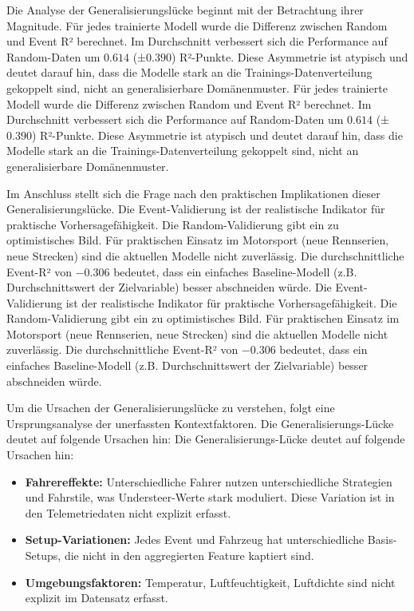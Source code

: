 Die Analyse der Generalisierungslücke beginnt mit der Betrachtung ihrer Magnitude. Für jedes trainierte Modell wurde die Differenz zwischen Random und Event R² berechnet. Im Durchschnitt verbessert sich die Performance auf Random-Daten um $0.614$ (±$0.390$) R²-Punkte. Diese Asymmetrie ist atypisch und deutet darauf hin, dass die Modelle stark an die Trainings-Datenverteilung gekoppelt sind, nicht an generalisierbare Domänenmuster.
Für jedes trainierte Modell wurde die Differenz zwischen Random und Event R² berechnet. Im Durchschnitt verbessert sich die Performance auf Random-Daten um $0.614$ (±$0.390$) R²-Punkte. Diese Asymmetrie ist atypisch und deutet darauf hin, dass die Modelle stark an die Trainings-Datenverteilung gekoppelt sind, nicht an generalisierbare Domänenmuster.

Im Anschluss stellt sich die Frage nach den praktischen Implikationen dieser Generalisierungslücke. Die Event-Validierung ist der realistische Indikator für praktische Vorhersagefähigkeit. Die Random-Validierung gibt ein zu optimistisches Bild. Für praktischen Einsatz im Motorsport (neue Rennserien, neue Strecken) sind die aktuellen Modelle nicht zuverlässig. Die durchschnittliche Event-R² von $-0.306$ bedeutet, dass ein einfaches Baseline-Modell (z.B. Durchschnittswert der Zielvariable) besser abschneiden würde.
Die Event-Validierung ist der realistische Indikator für praktische Vorhersagefähigkeit. Die Random-Validierung gibt ein zu optimistisches Bild. Für praktischen Einsatz im Motorsport (neue Rennserien, neue Strecken) sind die aktuellen Modelle nicht zuverlässig. Die durchschnittliche Event-R² von $-0.306$ bedeutet, dass ein einfaches Baseline-Modell (z.B. Durchschnittswert der Zielvariable) besser abschneiden würde.

Um die Ursachen der Generalisierungslücke zu verstehen, folgt eine Ursprungsanalyse der unerfassten Kontextfaktoren. Die Generalisierungs-Lücke deutet auf folgende Ursachen hin:
Die Generalisierungs-Lücke deutet auf folgende Ursachen hin:
\begin{itemize}
  \item \textbf{Fahrereffekte:} Unterschiedliche Fahrer nutzen unterschiedliche Strategien und Fahrstile, was Understeer-Werte stark moduliert. Diese Variation ist in den Telemetriedaten nicht explizit erfasst.
  \item \textbf{Setup-Variationen:} Jedes Event und Fahrzeug hat unterschiedliche Basis-Setups, die nicht in den aggregierten Feature kaptiert sind.
  \item \textbf{Umgebungsfaktoren:} Temperatur, Luftfeuchtigkeit, Luftdichte sind nicht explizit im Datensatz erfasst.
\end{itemize}


